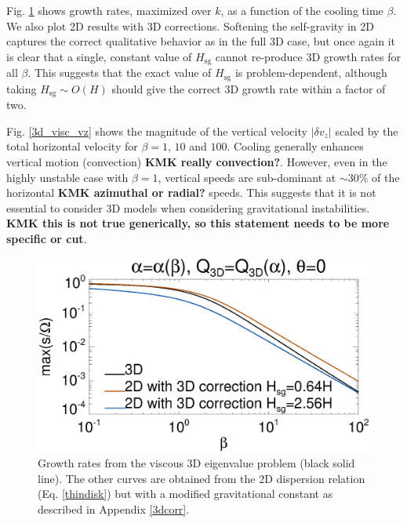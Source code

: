Fig. \ref{3d_visc} shows growth rates, maximized over $k$, as a
function of the cooling time $\beta$. We also plot 2D results with 3D
corrections. Softening the self-gravity in 2D captures the correct 
qualitative behavior as in the full 3D case, but once again it is clear that a
single, constant value of $H_\mathrm{sg}$ cannot re-produce 3D growth 
rates for all $\beta$. 
This suggests that the exact value of
$H_\mathrm{sg}$ is problem-dependent, although taking
$H_\mathrm{sg}\sim O(H)$ should give the correct 3D growth rate within
a factor of two. 

Fig. \ref{3d_visc_vz} shows the magnitude of the vertical velocity
$|\delta v_z|$ scaled by the total horizontal velocity for $\beta =
1,\,10$ and $100$. Cooling generally enhances vertical motion
(convection) {\bf KMK really convection?}. However, even in the highly unstable case with $\beta=1$,
vertical speeds are sub-dominant at $\sim 30\%$ of the horizontal
{\bf KMK  azimuthal or radial?} speeds. This suggests that it is not essential to consider 3D models
when considering gravitational instabilities. {\bf KMK this is not true generically, so
this statement needs to be more specific or cut}.

\begin{figure}
  \includegraphics[width=\linewidth,clip=true,trim=0cm 0.cm 0.23cm
    0.0cm]{figures/growth_visc3d}
  \caption{Growth rates from the viscous 3D eigenvalue problem (black solid
    line). The other curves are obtained from the 2D dispersion
    relation (Eq. \ref{thindisk}) but with a modified gravitational
    constant as described in Appendix \ref{3dcorr}. \label{3d_visc}}
\end{figure}



